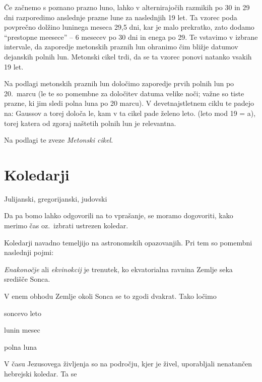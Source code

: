 Če začnemo s poznano prazno luno, lahko v alternirajočih razmikih po 30 in 29 
dni razporedimo anslednje prazne lune za naslednjih 19 let. Ta vzorec poda
povprečno dolžino luninega meseca 29,5 dni, kar je malo prekratko, zato 
dodamo ``prestopne meesece'' -- 6 mesecev po 30 dni in enega po 29. Te 
vstavimo v izbrane intervale, da zaporedje metonskih praznih lun ohranimo čim
bližje datumov dejanskih polnih lun. Metonski cikel trdi, da se ta vzorec 
ponovi natanko vsakih 19 let.

Na podlagi metonskih praznih lun določimo zaporedje prvih polnih lun po 20.\ 
marcu (le te so pomembne za določitev datuma velike noči; važne so tiste prazne, 
ki jim sledi polna luna po 20 marcu). V devetnajstletnem 
ciklu te padejo na:
Gaussov a torej določa le, kam v ta cikel pade želeno leto. (leto mod 19 = a),
torej katera od zgoraj naštetih polnih lun je relevantna.

Na podlagi te zveze
 \emph{Metonski cikel}.





\section{Koledarji}

Julijanski, gregorijanski, judovski


Da pa bomo lahko
odgovorili na to vprašanje, se moramo dogovoriti, kako merimo čas oz.\ 
izbrati ustrezen koledar.

Koledarji navadno temeljijo na astronomskih opazovanjih. Pri tem so pomembni
naslednji pojmi:
\begin{definicija}
   \emph{Enakonočje} ali \emph{ekvinokcij} je trenutek, ko ekvatorialna 
   ravnina Zemlje seka središče Sonca.
\end{definicija}
V enem obhodu Zemlje okoli Sonca se to zgodi dvakrat. Tako ločimo 
\begin{definicija}
   soncevo leto
\end{definicija}
\begin{definicija}
   lunin mesec
\end{definicija}
\begin{definicija}
   polna luna
\end{definicija}

V času Jezusovega življenja so na področju, kjer je živel, uporabljali 
nenatančen hebrejski koledar. Ta se 



